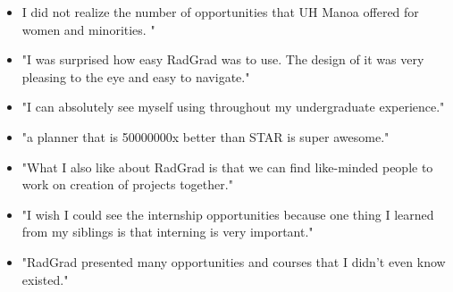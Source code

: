 \documentclass[acmsmall,nonacm]{acmart}
\begin{document}
\begin{itemize}
\item I did not realize the number of opportunities that UH Manoa offered for women and minorities. "
\end{itemize}

\begin{itemize}
\item "I was surprised how easy RadGrad was to use. The design of it was very pleasing to the eye and easy to navigate."
\end{itemize}

\begin{itemize}
\item "I can absolutely see myself using throughout my undergraduate experience."
\end{itemize}

\begin{itemize}
\item "a planner that is 50000000x better than STAR is super awesome."
\end{itemize}

\begin{itemize}
\item "What I also like about RadGrad is that we can find like-minded people to work on creation of projects together."
\end{itemize}

\begin{itemize}
\item "I wish I could see the internship opportunities because one thing I learned from my siblings is that interning is very important."
\end{itemize}

\begin{itemize}
\item "RadGrad presented many opportunities and courses that I didn't even know existed."
\end{itemize}







\end{document}
